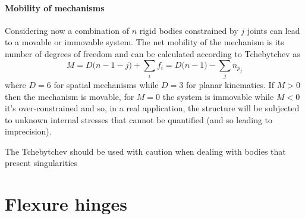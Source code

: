 	\paragraph{Mobility of mechanisms} Considering now  a combination of $n$ rigid bodies constrained by $j$ joints can lead to a movable or immovable system. The net mobility of the mechanism is its number of degrees of freedom and can be calculated according to Tchebytchev as
	\begin{equation}
		M = D\big(n-1-j\big) +\sum_i f_i = D\big(n-1\big) -\sum_j n_{p_j}
	\end{equation}
	where $D= 6$ for spatial mechanisms while $D= 3$ for planar kinematics. If $M>0$ then the mechanism is movable, for $M = 0$ the system is immovable while $M < 0$ it's over-constrained and so, in a real application, the structure will be subjected to unknown internal stresses that cannot be quantified (and so leading to imprecision).
	
	The Tchebytchev should be used with caution when dealing with bodies that present singularities	
	
	
	
	
	
	
	
	
	
	
	
	
	
	
	
	
	
	
	
	
	
	
	
	
	
	
	
	
	
	

\section{Flexure hinges}
	
	
	
	
	
	
	
	
	
	
	
	
	
	
	
	
	
	
	
	
	
	
	
	
	
	
	
	
	
	
	
	
	
	
	
	
	
	
	
	
	
	
	
	